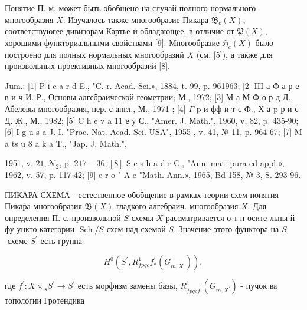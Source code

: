 \documentclass[10pt]{article}
\begin{document}
Понятие П. м. может быть обобщено на случай полного нормального многообразия $X$. Изучалось также многообразие Пикара $\mathfrak{B}_{c}(X)$, соответствуюгее дивизорам Картье и обладающее, в отличие от $\mathfrak{P}(X)$, хорошими функториальными свойствами [9]. Многообразие $\mathfrak{H}_{c}(X)$ было построено для полных нормальных многообразий $X$ (см. [5]), а также для произвольных проективных многообразий [8].



Jum.: [1] P i c a r d E., "C. r. Acad. Sci.», 1884, t. 99, p. 961963; [2] III а Ф а р е в и ч И. Р., Основы алгебраической геометрии; М., 1972; [3] М а М Ф о р д Д., Абелевы многообразия, пер. с англ., М., 1971 ; [4] $\Gamma$ p и фф и т с Ф., Х а p р и с Д. Ж., М., 1982; [5] C h e v a 11 е у С., "Amer. J. Мath.", 1960, v. 82, p. 435-90; [6] I g u s a J.-I. "Proc. Nat. Acad. Sci. USA", 1955 , v. 41, № 11, p. 964-67; [7] M a ts u 8 a k a T., "Jap. J. Math.",

1951, v. $21, \mathcal{N}_{2}$, p. $217-36 ;[8]$ S e s h a d r C., "Ann. mat. pura ed appl.», 1962, v. 57, p. 117-42; [9] e r o " A e "Math. Ann.», 1965, Bd 158, № 3, S. 293-96.



ПИКАРА СХЕМА - естественное обобщение в рамках теории схем понятия Пикара многообразия $\mathfrak{B}(X)$ гладкого алгебраич. многообразия $X$. Для определения П. с. произвольной $S$-схемы $X$ рассматривается о т н осите льны й фу ункто категории $\operatorname{Sch} / S$ схем над схемой $S$. Значение этого функтора на $S$-схеме $S^{\prime}$ есть группа



\[

H^{0}\left(S^{\prime}, R_{f p q c}^{1} f_{*}^{\prime}\left(G_{m, X^{\prime}}\right)\right),

\]



где $f^{\prime}: X \times{ }_{s} S^{\prime} \rightarrow S^{\prime}$ есть морфизм замены базы, $R_{f p q c f^{\prime}}^{1}\left(G_{m, X^{\prime}}\right)$ - пучок ва топологии Гротендика
\end{document}
